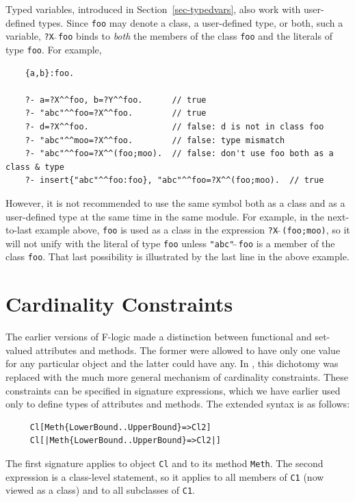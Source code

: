 \documentclass[11pt]{article}
\newcommand{\ERGO}{\mbox{\smaller{\ensuremath{\cal{E}}\smaller{{\sc{RGO}}}}}\xspace}
\newcommand{\FLSYSTEM}{\ERGO}
\begin{document}
Typed variables, introduced in Section~\ref{sec-typedvars}, also work with
user-defined types. Since \texttt{foo} may denote a class, a user-defined
type, or both, such a variable, \texttt{?X$\hat{~}\hat{~}$foo} binds to
\emph{both} the members of the class \texttt{foo} and the literals of type
\texttt{foo}. For example,
\begin{verbatim}
    {a,b}:foo.

    ?- a=?X^^foo, b=?Y^^foo.      // true
    ?- "abc"^^foo=?X^^foo.        // true
    ?- d=?X^^foo.                 // false: d is not in class foo
    ?- "abc"^^moo=?X^^foo.        // false: type mismatch
    ?- "abc"^^foo=?X^^(foo;moo).  // false: don't use foo both as a class & type
    ?- insert{"abc"^^foo:foo}, "abc"^^foo=?X^^(foo;moo).  // true
\end{verbatim}
However, it is not recommended to use the same symbol both as a class and
as a user-defined type at the same time in the same module. For example, in
the next-to-last example above, \texttt{foo} is used as a class in the
expression \texttt{?X$\hat{~}\hat{~}$(foo;moo)}, so it will not unify with the literal of type
\texttt{foo} unless \texttt{"abc"$\hat{~}\hat{~}$foo} is a member of the
class \texttt{foo}. That last possibility is illustrated by the last line
in the above example.  





\section{Cardinality Constraints}\label{sec-card-in-signatures}

The earlier versions of F-logic made a distinction between functional and
set-valued attributes and methods. The former were allowed to have only one
value for any particular object and the latter could have any. In \FLSYSTEM,
this dichotomy was replaced with the much more general mechanism of
cardinality constraints. These constraints can be specified in signature
expressions, which we have earlier used only to define types of attributes
and methods. The extended syntax is as follows:
\begin{verbatim}
     Cl[Meth{LowerBound..UpperBound}=>Cl2]
     Cl[|Meth{LowerBound..UpperBound}=>Cl2|]
\end{verbatim}
The first signature applies to object {\tt Cl} and to its 
method {\tt Meth}. The second expression is a class-level statement, so it
applies to all members of \texttt{C1} (now viewed as a class) and to all
subclasses of \texttt{C1}.  
\end{document}
